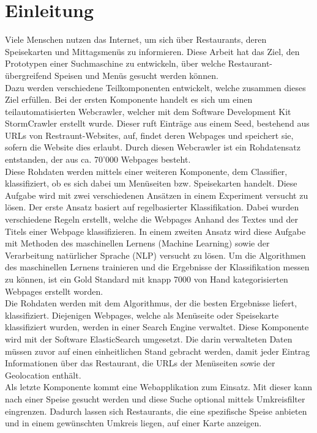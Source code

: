 \chapter{Einleitung}
Viele Menschen nutzen das Internet, um sich über Restaurants, deren Speisekarten und Mittagsmenüs zu informieren.
Diese Arbeit hat das Ziel, den Prototypen einer Suchmaschine zu entwickeln, über welche Restaurant-übergreifend Speisen und Menüs gesucht werden können.\\
Dazu werden verschiedene Teilkomponenten entwickelt, welche zusammen dieses Ziel erfüllen.
Bei der ersten Komponente handelt es sich um einen teilautomatisierten Webcrawler, welcher mit dem Software Development Kit \glqq StormCrawler\grqq{} erstellt wurde.
Dieser ruft Einträge aus einem Seed, bestehend aus URLs von Restraunt-Websites, auf, findet deren Webpages  und speichert sie, sofern die Website dies erlaubt.
Durch diesen Webcrawler ist ein Rohdatensatz entstanden, der aus ca. 70'000 Webpages besteht.\\
Diese Rohdaten werden mittels einer weiteren Komponente, dem Classifier, klassifiziert, ob es sich dabei um Menüseiten bzw. Speisekarten handelt.
Diese Aufgabe wird mit zwei verschiedenen Ansätzen in einem Experiment versucht zu lösen.
Der erste Ansatz basiert auf regelbasierter Klassifikation.
Dabei wurden verschiedene Regeln erstellt, welche die Webpages Anhand des Textes und der Titels einer Webpage klassifizieren.
In einem zweiten Ansatz wird diese Aufgabe mit Methoden des maschinellen Lernens (Machine Learning) sowie der Verarbeitung natürlicher Sprache (NLP) versucht zu lösen.
Um die Algorithmen des maschinellen Lernens trainieren und die Ergebnisse der Klassifikation messen zu können, ist ein Gold Standard mit knapp 7000 von Hand kategorisierten Webpages erstellt worden.\\
Die Rohdaten werden mit dem Algorithmus, der die besten Ergebnisse liefert, klassifiziert.
Diejenigen Webpages, welche als Menüseite oder Speisekarte klassifiziert wurden, werden in einer Search Engine verwaltet.
Diese Komponente wird mit der Software ElasticSearch umgesetzt.
Die darin verwalteten Daten müssen zuvor auf einen einheitlichen Stand gebracht werden, damit jeder Eintrag Informationen über das Restaurant, die URLs der Menüseiten sowie der Geolocation enthält.\\
Als letzte Komponente kommt eine Webapplikation zum Einsatz. 
Mit dieser kann nach einer Speise gesucht werden und diese Suche optional mittels Umkreisfilter eingrenzen.
Dadurch lassen sich Restaurants, die eine spezifische Speise anbieten und in einem gewünschten Umkreis liegen, auf einer Karte anzeigen.
